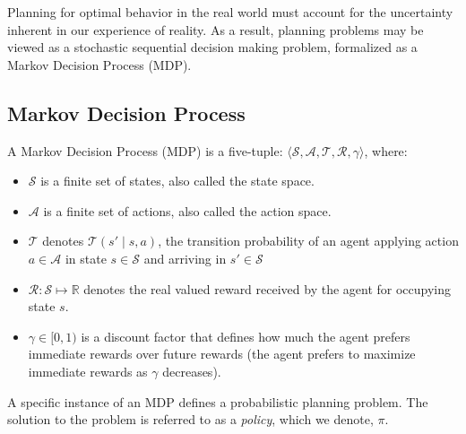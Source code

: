 \documentclass[11pt]{article}
\begin{document}
%
%
%
%
%

Planning for optimal behavior in the real world must account for the uncertainty inherent in our experience of reality. As a result, planning problems may be viewed as a stochastic sequential decision making problem, formalized as a Markov Decision Process (MDP).

\subsection{Markov Decision Process}
{ A \textup{Markov Decision Process (MDP)} is a five-tuple: $\langle \mathcal{S},
\mathcal{A}, \mathcal{T}, \mathcal{R}, \gamma \rangle$, where:
\begin{itemize}
\item $\mathcal{S}$ is a finite set of states, also called the \textup{state space}.
\item $\mathcal{A}$ is a finite set of actions, also called the \textup{action space}.
\item $\mathcal{T}$ denotes $\mathcal{T}(s' \mid s,a)$, the
transition probability of an agent applying action $a \in \mathcal{A}$
in state $s \in \mathcal{S}$ and arriving in $s' \in \mathcal{S}$
\item $\mathcal{R} : \mathcal{S}\mapsto \mathbb{R}$ denotes the real valued reward received by the agent for occupying state $s$.
\item $\gamma \in [0, 1)$ is a discount factor that defines how much the
  agent prefers immediate rewards over future rewards (the agent
  prefers to maximize immediate rewards as $\gamma$ decreases).
\end{itemize}}

A specific instance of an MDP defines a probabilistic planning problem. The solution to the problem is referred to as a {\it policy}, which we denote, $\pi$. \\
\end{document}
